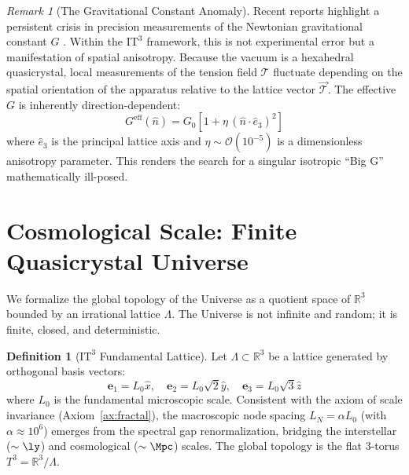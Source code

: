 \documentclass[12pt,a4paper,oneside]{article}
\theoremstyle{plain}
\theoremstyle{definition}
\newtheorem{definition}[theorem]{Definition}
\theoremstyle{remark}
\newtheorem{remark}[theorem]{Remark}
\newcommand{\R}{\mathbb{R}}
\newcommand{\ITthree}{\mathrm{IT}^3}
\newcommand{\tension}{\mathcal{T}}
\newcommand{\GNewton}{G}
\begin{document}
\begin{remark}[The Gravitational Constant Anomaly]
Recent reports highlight a persistent crisis in precision measurements of the Newtonian gravitational constant $\GNewton$ \cite{NatureG2026}. Within the \texorpdfstring{$\ITthree$}{IT3} framework, this is not experimental error but a manifestation of spatial anisotropy. Because the vacuum is a hexahedral quasicrystal, local measurements of the tension field $\tension$ fluctuate depending on the spatial orientation of the apparatus relative to the lattice vector $\vec{\tension}$. The effective $\GNewton$ is inherently direction-dependent:
\begin{equation}
\GNewton^{\mathrm{eff}}(\hat{n}) = \GNewton_0 \left[ 1 + \eta \, (\hat{n} \cdot \hat{e}_3)^2 \right]
\end{equation}
where $\hat{e}_3$ is the principal lattice axis and $\eta \sim \mathcal{O}(10^{-5})$ is a dimensionless anisotropy parameter. This renders the search for a singular isotropic ``Big G'' mathematically ill-posed.
\end{remark}

\section{Cosmological Scale: Finite Quasicrystal Universe}
\label{sec:macro}

We formalize the global topology of the Universe as a quotient space of $\R^3$ bounded by an irrational lattice $\Lambda$. The Universe is not infinite and random; it is finite, closed, and deterministic.

\begin{definition}[\texorpdfstring{$\ITthree$}{IT3} Fundamental Lattice]
\label{def:lattice}
Let $\Lambda \subset \R^3$ be a lattice generated by orthogonal basis vectors:
\begin{equation}
\mathbf{e}_1 = L_0 \hat{x}, \quad \mathbf{e}_2 = L_0\sqrt{2} \hat{y}, \quad \mathbf{e}_3 = L_0\sqrt{3} \hat{z}
\end{equation}
where $L_0$ is the fundamental microscopic scale. Consistent with the axiom of scale invariance (Axiom~\ref{ax:fractal}), the macroscopic node spacing $L_N = \alpha L_0$ (with $\alpha \approx 10^6$) emerges from the spectral gap renormalization, bridging the interstellar ($\sim\si{\ly}$) and cosmological ($\sim\si{\Mpc}$) scales. The global topology is the flat 3-torus $T^3 = \R^3 / \Lambda$.
\end{definition}
\end{document}
